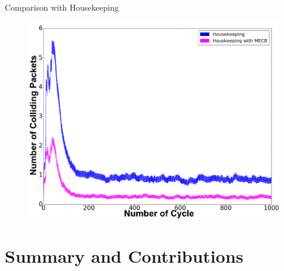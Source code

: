 \begin{withoutheadline}
\begin{frame}{Comparison with Housekeeping }

\begin{figure}[p]

\includegraphics[width=0.9\linewidth]{figures/graph2.png}
\end{figure}



\end{frame}
\end{withoutheadline}



\section{Summary and Contributions}


